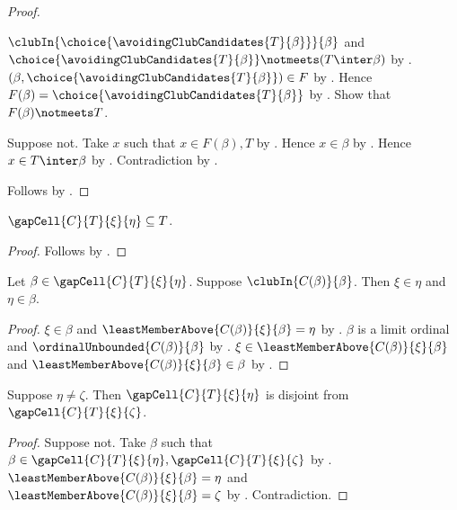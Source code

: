 \begin{proof}
\begin{subproof}
            $\clubIn{\choice{\avoidingClubCandidates{T}{\beta}}}{\beta}$ and
            $\choice{\avoidingClubCandidates{T}{\beta}}
                \notmeets(T\inter\beta)$
            by .
        $(\beta,\choice{\avoidingClubCandidates{T}{\beta}})\in F$
            by .
        Hence $F(\beta)=\choice{\avoidingClubCandidates{T}{\beta}}$
            by .
        Show that $F(\beta)\notmeets T$.
        \begin{subproof}
            Suppose not.
            Take $x$ such that $x\in F(\beta),T$ by .
            Hence $x\in\beta$ by .
            Hence $x\in T\inter\beta$ by .
            Contradiction by .
        \end{subproof}
    \end{subproof}
    Follows by .
\end{proof}

\begin{proposition}\label{gap_cell_subset}
    $\gapCell{C}{T}{\xi}{\eta}\subseteq T$.
\end{proposition}
\begin{proof}
    Follows by .
\end{proof}

\begin{proposition}\label{gap_cell_value_bounds}
    Let $\beta\in\gapCell{C}{T}{\xi}{\eta}$.
    Suppose $\clubIn{C(\beta)}{\beta}$.
    Then $\xi\in\eta$ and $\eta\in\beta$.
\end{proposition}
\begin{proof}
    $\xi\in\beta$ and
        $\leastMemberAbove{C(\beta)}{\xi}{\beta}=\eta$
        by .
    $\beta$ is a limit ordinal and
        $\ordinalUnbounded{C(\beta)}{\beta}$ by .
    $\xi\in\leastMemberAbove{C(\beta)}{\xi}{\beta}$ and
        $\leastMemberAbove{C(\beta)}{\xi}{\beta}\in\beta$
        by .
\end{proof}

\begin{proposition}\label{gap_cells_pairwise_disjoint}
    Suppose $\eta\neq\zeta$.
    Then $\gapCell{C}{T}{\xi}{\eta}$ is disjoint from
        $\gapCell{C}{T}{\xi}{\zeta}$.
\end{proposition}
\begin{proof}
    Suppose not.
    Take $\beta$ such that
        $\beta\in\gapCell{C}{T}{\xi}{\eta},
            \gapCell{C}{T}{\xi}{\zeta}$ by .
    $\leastMemberAbove{C(\beta)}{\xi}{\beta}=\eta$ and
        $\leastMemberAbove{C(\beta)}{\xi}{\beta}=\zeta$
        by .
    Contradiction.
\end{proof}

